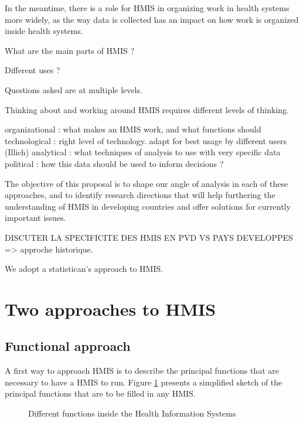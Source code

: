 \documentclass[a4paper,11pt,final,twoside]{article}
\begin{document}
In the meantime, there is a role for HMIS in organizing work in health systems more widely, as the way data is collected has an impact on how work is organized inside health systems. 

What are the main parts of HMIS ?

Different uses ?

Questions asked are at multiple levels.

Thinking about and working around HMIS requires different levels of thinking. 

organizational : what makes an HMIS work, and what functions should 
technological : right level of technology. adapt for best usage by different users (Illich)
analytical : what techniques of analysis to use with very specific data 
political : how this data should be used to inform decisions ?

The objective of this proposal is to shape our angle of analysis in each of these approaches, and to identify research directions that will help furthering the understanding of HMIS in developing countries and offer solutions for currently important issues.


DISCUTER LA SPECIFICITE DES HMIS EN PVD VS PAYS DEVELOPPES  => approche historique.

We adopt a statistican's approach to HMIS. 


\section{Two approaches to HMIS}

	\subsection{Functional approach}
	
A first way to approach HMIS is to describe the principal functions that are necessary to have a HMIS to run. Figure \ref{HMISFunctions} presents a simplified sketch of the principal functions that are to be filled in any HMIS. 

\begin{figure}[h]
\begin{center}
\end{center}
\caption{Different functions inside the Health Information Systems}
\label{HMISFunctions}
\end{figure}           
\end{document}
